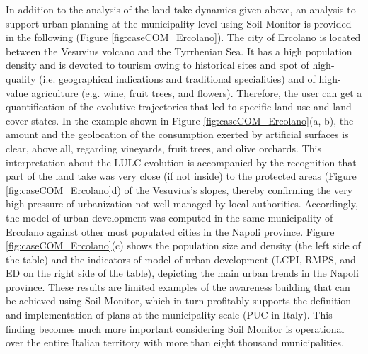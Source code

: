 \documentclass[APA,LATO1COL,doublespace]{WileyNJD-v2}
\begin{document}
In addition to the analysis of the land take dynamics given above, an analysis to support urban planning at the municipality level using Soil Monitor is provided in the following (Figure \ref{fig:caseCOM_Ercolano}).
The city of Ercolano is located between the Vesuvius volcano and the Tyrrhenian Sea. 
It has a high population density and is devoted to tourism owing to historical sites and spot of high-quality (i.e. geographical indications and traditional specialities) and of high-value agriculture (e.g. wine, fruit trees, and flowers). 
Therefore, the user can get a quantification of the evolutive trajectories that led to specific land use and land cover states. 
In the example shown in Figure \ref{fig:caseCOM_Ercolano}(a, b), the amount and the geolocation of the consumption exerted by artificial surfaces is clear, above all, regarding vineyards, fruit trees, and olive orchards. 
This interpretation about the LULC evolution is accompanied by the recognition that part of the land take was very close (if not inside) to the protected areas (Figure \ref{fig:caseCOM_Ercolano}d) of the Vesuvius's slopes, thereby confirming the very high pressure of urbanization not well managed by local authorities. 
Accordingly, the model of urban development was computed in the same municipality of Ercolano against other most populated cities in the Napoli province. 
Figure \ref{fig:caseCOM_Ercolano}(c) shows the population size and density (the left side of the table) and the indicators of model of urban development (LCPI, RMPS, and ED on the right side of the table), depicting the main urban trends in the Napoli province.
These results are limited examples of the awareness building that can be achieved using Soil Monitor, which in turn profitably supports the definition and implementation of plans at the municipality scale (PUC in Italy).
This finding becomes much more important considering Soil Monitor is operational over the entire Italian territory with more than eight thousand municipalities.
\end{document}
